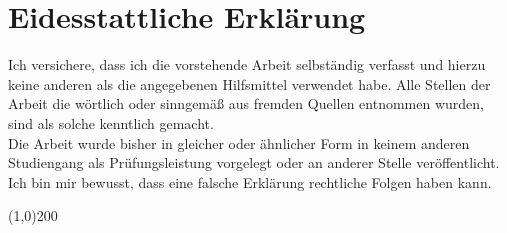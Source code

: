 \section*{Eidesstattliche Erklärung}\label{eidesstattliche-erkluxe4rung}

Ich versichere, dass ich die vorstehende Arbeit selbständig verfasst und
hierzu keine anderen als die angegebenen Hilfsmittel verwendet habe.
Alle Stellen der Arbeit die wörtlich oder sinngemäß aus fremden Quellen
entnommen wurden, sind als solche kenntlich
gemacht.\\[2\baselineskip]Die Arbeit wurde bisher in gleicher oder
ähnlicher Form in keinem anderen Studiengang als Prüfungsleistung
vorgelegt oder an anderer Stelle veröffentlicht.\\[2\baselineskip]Ich
bin mir bewusst, dass eine falsche Erklärung rechtliche Folgen haben
kann.

(1,0){200}
